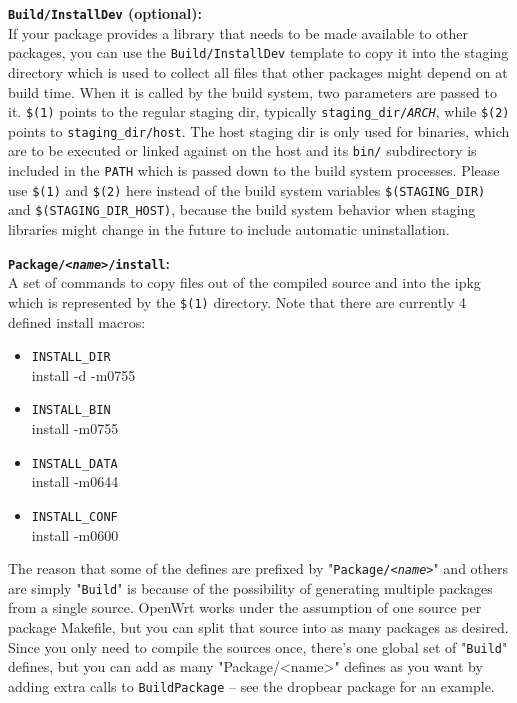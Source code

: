 \textbf{\texttt{Build/InstallDev} (optional):} \\
	If your package provides a library that needs to be made available to other packages,
	you can use the \texttt{Build/InstallDev} template to copy it into the staging directory
	which is used to collect all files that other packages might depend on at build time.
	When it is called by the build system, two parameters are passed to it. \texttt{\$(1)} points to
	the regular staging dir, typically \texttt{staging\_dir/\textit{ARCH}}, while \texttt{\$(2)} points
	to \texttt{staging\_dir/host}. The host staging dir is only used for binaries, which are
	to be executed or linked against on the host and its \texttt{bin/} subdirectory is included
	in the \texttt{PATH} which is passed down to the build system processes.
	Please use \texttt{\$(1)} and \texttt{\$(2)} here instead of the build system variables
	\texttt{\$(STAGING\_DIR)} and \texttt{\$(STAGING\_DIR\_HOST)}, because the build system behavior
	when staging libraries might change in the future to include automatic uninstallation.

\textbf{\texttt{Package/\textit{<name>}/install}:} \\
   A set of commands to copy files out of the compiled source and into the ipkg
   which is represented by the \texttt{\$(1)} directory. Note that there are currently
   4 defined install macros:
   \begin{itemize}
       \item \texttt{INSTALL\_DIR} \\
           install -d -m0755
       \item \texttt{INSTALL\_BIN} \\
           install -m0755
       \item \texttt{INSTALL\_DATA} \\
           install -m0644
       \item \texttt{INSTALL\_CONF} \\
           install -m0600
   \end{itemize}

The reason that some of the defines are prefixed by "\texttt{Package/\textit{<name>}}"
and others are simply "\texttt{Build}" is because of the possibility of generating
multiple packages from a single source. OpenWrt works under the assumption of one
source per package Makefile, but you can split that source into as many packages as
desired. Since you only need to compile the sources once, there's one global set of
"\texttt{Build}" defines, but you can add as many "Package/<name>" defines as you want
by adding extra calls to \texttt{BuildPackage} -- see the dropbear package for an example.

